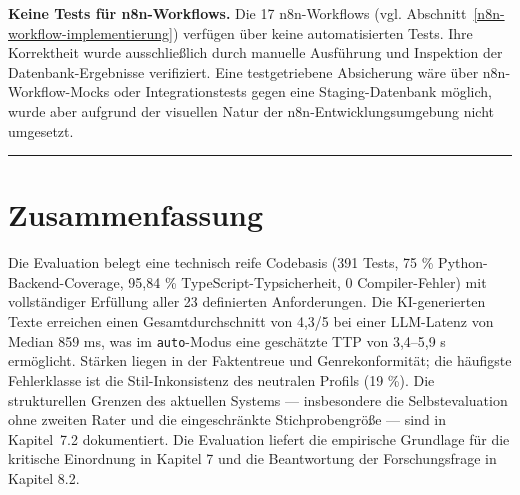 \textbf{Keine Tests für n8n-Workflows.} Die 17 n8n-Workflows (vgl.
Abschnitt~\ref{n8n-workflow-implementierung}) verfügen über keine automatisierten Tests. Ihre Korrektheit
wurde ausschließlich durch manuelle Ausführung und Inspektion der
Datenbank-Ergebnisse verifiziert. Eine testgetriebene Absicherung wäre
über n8n-Workflow-Mocks oder Integrationstests gegen eine
Staging-Datenbank möglich, wurde aber aufgrund der visuellen Natur der
n8n-Entwicklungsumgebung nicht umgesetzt.

\begin{center}\rule{0.5\linewidth}{0.5pt}\end{center}

\section{Zusammenfassung}\label{zusammenfassung}

Die Evaluation belegt eine technisch reife Codebasis (391 Tests, 75 \%
Python-Backend-Coverage, 95,84 \% TypeScript-Typsicherheit, 0
Compiler-Fehler) mit vollständiger Erfüllung aller 23 definierten
Anforderungen. Die KI-generierten Texte erreichen einen
Gesamtdurchschnitt von 4,3/5 bei einer LLM-Latenz von Median 859 ms, was
im \texttt{auto}-Modus eine geschätzte TTP von 3,4--5,9 s ermöglicht.
Stärken liegen in der Faktentreue und Genrekonformität; die häufigste
Fehlerklasse ist die Stil-Inkonsistenz des neutralen Profils (19 \%).
Die strukturellen Grenzen des aktuellen Systems --- insbesondere die
Selbstevaluation ohne zweiten Rater und die eingeschränkte
Stichprobengröße --- sind in Kapitel~7.2 dokumentiert. Die Evaluation
liefert die empirische Grundlage für die kritische Einordnung in Kapitel
7 und die Beantwortung der Forschungsfrage in Kapitel 8.2.
